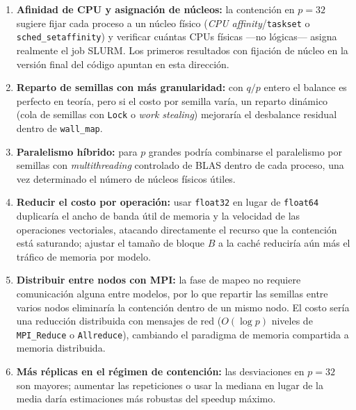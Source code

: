 \documentclass[11pt, a4paper]{article}
\begin{document}
\begin{enumerate}
    \item \textbf{Afinidad de CPU y asignación de núcleos:} la contención en $p = 32$ sugiere fijar cada proceso a un núcleo físico (\textit{CPU affinity}/\texttt{taskset} o \texttt{sched\_setaffinity}) y verificar cuántas CPUs físicas ---no lógicas--- asigna realmente el job SLURM. Los primeros resultados con fijación de núcleo en la versión final del código apuntan en esta dirección.
    \item \textbf{Reparto de semillas con más granularidad:} con $q/p$ entero el balance es perfecto en teoría, pero si el costo por semilla varía, un reparto dinámico (cola de semillas con \texttt{Lock} o \textit{work stealing}) mejoraría el desbalance residual dentro de \texttt{wall\_map}.
    \item \textbf{Paralelismo híbrido:} para $p$ grandes podría combinarse el paralelismo por semillas con \textit{multithreading} controlado de BLAS dentro de cada proceso, una vez determinado el número de núcleos físicos útiles.
    \item \textbf{Reducir el costo por operación:} usar \texttt{float32} en lugar de \texttt{float64} duplicaría el ancho de banda útil de memoria y la velocidad de las operaciones vectoriales, atacando directamente el recurso que la contención está saturando; ajustar el tamaño de bloque $B$ a la caché reduciría aún más el tráfico de memoria por modelo.
    \item \textbf{Distribuir entre nodos con MPI:} la fase de mapeo no requiere comunicación alguna entre modelos, por lo que repartir las semillas entre varios nodos eliminaría la contención dentro de un mismo nodo. El costo sería una reducción distribuida con mensajes de red ($O(\log p)$ niveles de \texttt{MPI\_Reduce} o \texttt{Allreduce}), cambiando el paradigma de memoria compartida a memoria distribuida.
    \item \textbf{Más réplicas en el régimen de contención:} las desviaciones en $p = 32$ son mayores; aumentar las repeticiones o usar la mediana en lugar de la media daría estimaciones más robustas del speedup máximo.

\end{enumerate}
\end{document}
